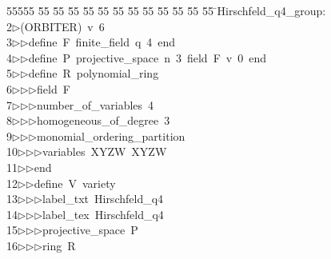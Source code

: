 %
%
\begin{tabbing}
55555 \= 55 \= 55 \= 55 \= 55 \= 55 \= 55 \= 55 \= 55 \= 55 \= 55 \= 55 \= 55 \= \>Hirschfeld\_q4\_group:\\[0pt]
2\>$\triangleright$\>(ORBITER)\ v\ 6\ \\[0pt]
3\>$\triangleright$\>$\triangleright$\>define\ F\ finite\_field\ q\ 4\ end\ \\[0pt]
4\>$\triangleright$\>$\triangleright$\>define\ P\ projective\_space\ n\ 3\ field\ F\ v\ 0\ end\ \\[0pt]
5\>$\triangleright$\>$\triangleright$\>define\ R\ polynomial\_ring\ \\[0pt]
6\>$\triangleright$\>$\triangleright$\>$\triangleright$\>field\ F\ \\[0pt]
7\>$\triangleright$\>$\triangleright$\>$\triangleright$\>number\_of\_variables\ 4\ \\[0pt]
8\>$\triangleright$\>$\triangleright$\>$\triangleright$\>homogeneous\_of\_degree\ 3\ \\[0pt]
9\>$\triangleright$\>$\triangleright$\>$\triangleright$\>monomial\_ordering\_partition\ \\[0pt]
10\>$\triangleright$\>$\triangleright$\>$\triangleright$\>variables\ XYZW\ XYZW\ \\[0pt]
11\>$\triangleright$\>$\triangleright$\>end\ \\[0pt]
12\>$\triangleright$\>$\triangleright$\>define\ V\ variety\ \\[0pt]
13\>$\triangleright$\>$\triangleright$\>$\triangleright$\>label\_txt\ Hirschfeld\_q4\ \\[0pt]
14\>$\triangleright$\>$\triangleright$\>$\triangleright$\>label\_tex\ Hirschfeld\_q4\ \\[0pt]
15\>$\triangleright$\>$\triangleright$\>$\triangleright$\>projective\_space\ P\ \\[0pt]
16\>$\triangleright$\>$\triangleright$\>$\triangleright$\>ring\ R\ \\[0pt]

\end{tabbing}
